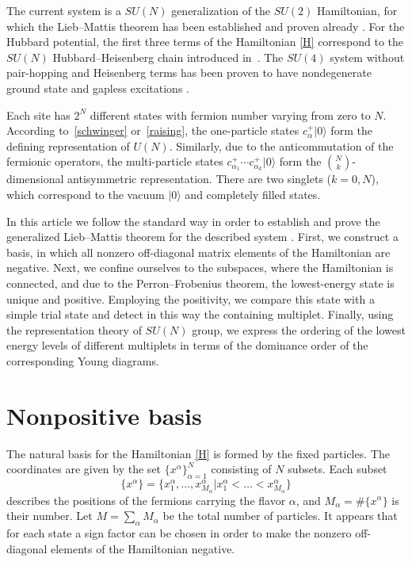 \documentclass[11pt]{article}
\begin{document}
The current system  is a $SU(N)$ generalization of the $SU(2)$ Hamiltonian,
for which the Lieb--Mattis theorem  has been established
and proven already \cite{Amb92-2}.
For the Hubbard potential, the
f\/irst three terms of the Hamiltonian \eqref{H}
correspond to the $SU(N)$ Hubbard--Heisenberg chain
introduced in~\cite{MA89}.
The $SU(4)$ system without pair-hopping and Heisenberg terms has been proven to have  nondegenerate
ground state and gapless excitations \cite{LTML04}.

Each site has $2^N$ dif\/ferent states with fermion number varying from
zero to $N$.
According to~\eqref{schwinger} or~\eqref{raising},
the one-particle states $c^+_{\alpha}|0\rangle$ form the def\/ining
representation of $U(N)$.
Similarly, due to the anticommutation of the fermionic operators,
the multi-particle states $c^+_{\alpha_1}\cdots c^+_{\alpha_k}|0\rangle $
form the $\binom{N}{k}$-dimensional antisymmetric representation.
There are two singlets ($k=0,N$), which correspond to
the vacuum $|0\rangle $ and completely f\/illed states.

In this article we follow the standard way in order to establish and prove the generalized Lieb--Mattis
theorem for the described system \cite{LM62,H07}. First, we construct a basis, in which all
nonzero of\/f-diagonal matrix elements of the Hamiltonian are negative.
Next, we conf\/ine ourselves to the subspaces, where the Hamiltonian is connected,
and due to the Perron--Frobenius theorem, the lowest-energy state
is unique and positive. Employing the positivity, we compare this state with a simple trial state
and detect in this way  the containing multiplet.
Finally, using the representation theory of $SU(N)$ group, we express the ordering
of the lowest energy levels of dif\/ferent multiplets in terms of the dominance
order of the corresponding Young diagrams.


\section{Nonpositive basis}\label{section3}

The natural basis for the Hamiltonian \eqref{H} is formed by the f\/ixed particles. The coordinates
are given by the set $\{x^\alpha\}_{\alpha=1}^N$ consisting of $N$  subsets. Each subset
\[
\{x^\alpha\}=\{x^\alpha_1,\dots,x^\alpha_{M_\alpha} | x^\alpha_1<\dots <x^\alpha_{M_\alpha}\}
\]
describes the positions of the fermions carrying the f\/lavor $\alpha$, and $M_\alpha=\#\{x^\alpha\}$
is their number. Let  $M=\sum_\alpha M_\alpha$
be the total number of particles.
It appears that for each state a sign factor can be
chosen in order to make the nonzero of\/f-diagonal elements of the Hamiltonian
negative.
\end{document}
